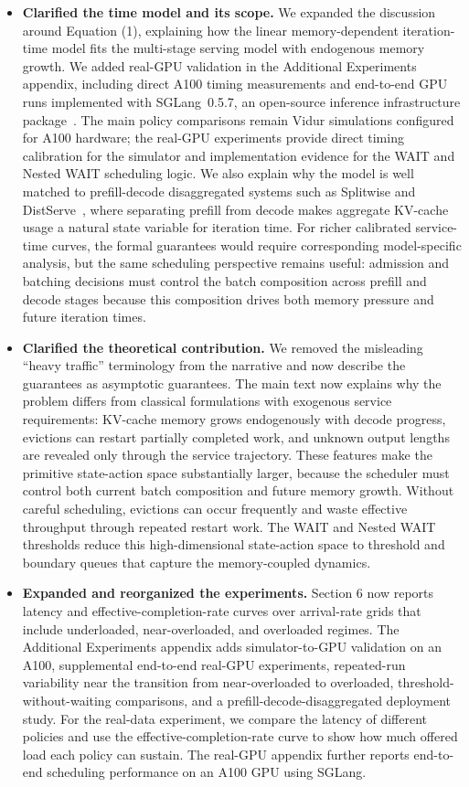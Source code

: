 \begin{itemize}
    \item \textbf{Clarified the time model and its scope.} We expanded the discussion around Equation (1), explaining how the linear memory-dependent iteration-time model fits the multi-stage serving model with endogenous memory growth. We added real-GPU validation in the Additional Experiments appendix, including direct A100 timing measurements and end-to-end GPU runs implemented with SGLang~0.5.7, an open-source inference infrastructure package~\citep{sglang-github}. The main policy comparisons remain Vidur simulations configured for A100 hardware; the real-GPU experiments provide direct timing calibration for the simulator and implementation evidence for the WAIT and Nested WAIT scheduling logic. We also explain why the model is well matched to prefill-decode disaggregated systems such as Splitwise and DistServe~\citep{patel2024splitwise,zhong2024distserve}, where separating prefill from decode makes aggregate KV-cache usage a natural state variable for iteration time. For richer calibrated service-time curves, the formal guarantees would require corresponding model-specific analysis, but the same scheduling perspective remains useful: admission and batching decisions must control the batch composition across prefill and decode stages because this composition drives both memory pressure and future iteration times.
    \item \textbf{Clarified the theoretical contribution.} We removed the misleading ``heavy traffic'' terminology from the narrative and now describe the guarantees as asymptotic guarantees. The main text now explains why the problem differs from classical formulations with exogenous service requirements: KV-cache memory grows endogenously with decode progress, evictions can restart partially completed work, and unknown output lengths are revealed only through the service trajectory. These features make the primitive state-action space substantially larger, because the scheduler must control both current batch composition and future memory growth. Without careful scheduling, evictions can occur frequently and waste effective throughput through repeated restart work. The WAIT and Nested WAIT thresholds reduce this high-dimensional state-action space to threshold and boundary queues that capture the memory-coupled dynamics.
    \item \textbf{Expanded and reorganized the experiments.} Section 6 now reports latency and effective-completion-rate curves over arrival-rate grids that include underloaded, near-overloaded, and overloaded regimes. The Additional Experiments appendix adds simulator-to-GPU validation on an A100, supplemental end-to-end real-GPU experiments, repeated-run variability near the transition from near-overloaded to overloaded, threshold-without-waiting comparisons, and a prefill-decode-disaggregated deployment study. For the real-data experiment, we compare the latency of different policies and use the effective-completion-rate curve to show how much offered load each policy can sustain. The real-GPU appendix further reports end-to-end scheduling performance on an A100 GPU using SGLang.

\end{itemize}
